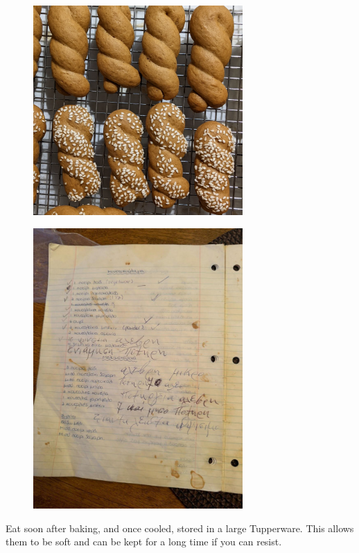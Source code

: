 \begin{figure}
  \includegraphics[width=80mm]{monanteras/images/Moustokouloura.jpg}
\end{figure}
\begin{figure}
  \includegraphics[width=80mm]{monanteras/images/Moustokouloura recipe.jpg}
\end{figure}

Eat soon after baking, and once cooled, stored in a large Tupperware. This allows them to be soft and can be kept for a long time if you can resist.

